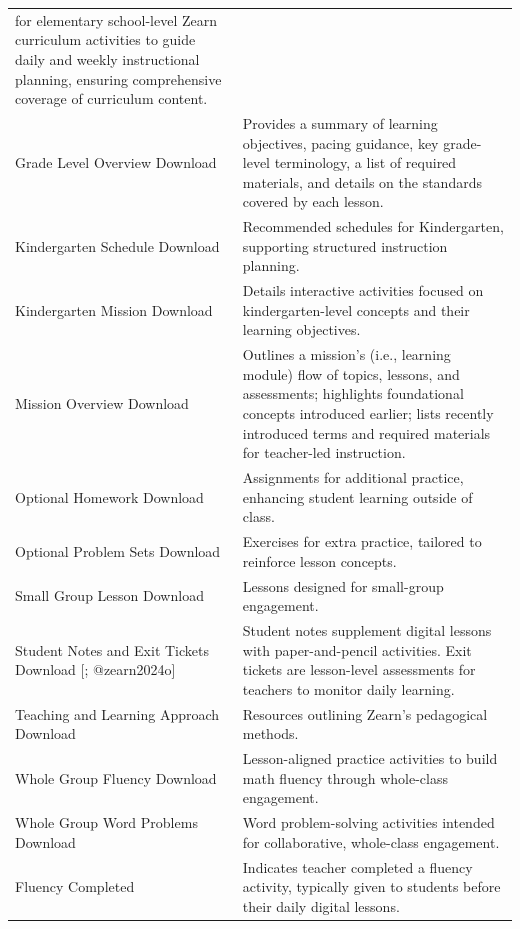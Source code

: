 \documentclass[
  number,
  preprint,
  3p,
  onecolumn]{elsarticle}
\begin{document}
\begin{longtable}[]{@{}
  >{\raggedright\arraybackslash}p{}
  >{\raggedright\arraybackslash}p{}@{}}
for elementary school-level Zearn curriculum activities to guide daily
and weekly instructional planning, ensuring comprehensive coverage of
curriculum content. \\
Grade Level Overview Download \citep{zearn2024h} & Provides a summary of
learning objectives, pacing guidance, key grade-level terminology, a
list of required materials, and details on the standards covered by each
lesson. \\
Kindergarten Schedule Download \citep{zearn2024i} & Recommended
schedules for Kindergarten, supporting structured instruction
planning. \\
Kindergarten Mission Download \citep{zearn2024j} & Details interactive
activities focused on kindergarten-level concepts and their learning
objectives. \\
Mission Overview Download \citep{zearn2024h} & Outlines a mission's
(i.e., learning module) flow of topics, lessons, and assessments;
highlights foundational concepts introduced earlier; lists recently
introduced terms and required materials for teacher-led instruction. \\
Optional Homework Download \citep{zearn2024k} & Assignments for
additional practice, enhancing student learning outside of class. \\
Optional Problem Sets Download \citep{zearn2024l} & Exercises for extra
practice, tailored to reinforce lesson concepts. \\
Small Group Lesson Download \citep{zearn2024m} & Lessons designed for
small-group engagement. \\
Student Notes and Exit Tickets Download {[}\citep{zearn2024n};
@zearn2024o{]} & Student notes supplement digital lessons with
paper-and-pencil activities. Exit tickets are lesson-level assessments
for teachers to monitor daily learning. \\
Teaching and Learning Approach Download \citep{zearn2024p} & Resources
outlining Zearn's pedagogical methods. \\
Whole Group Fluency Download \citep{zearn2024q} & Lesson-aligned
practice activities to build math fluency through whole-class
engagement. \\
Whole Group Word Problems Download \citep{zearn2024m} & Word
problem-solving activities intended for collaborative, whole-class
engagement. \\
Fluency Completed \citep{zearn2024q} & Indicates teacher completed a
fluency activity, typically given to students before their daily digital
lessons. \\

\end{longtable}
\end{document}
